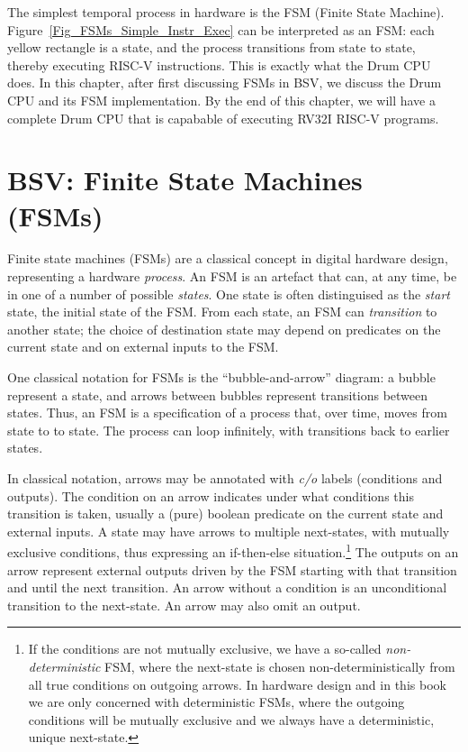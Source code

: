 The simplest temporal process in hardware is the FSM (Finite State
Machine).  Figure~\ref{Fig_FSMs_Simple_Instr_Exec} can be interpreted as an
FSM: each yellow rectangle is a state, and the process transitions
from state to state, thereby executing RISC-V instructions.  This is
exactly what the Drum CPU does.  In this chapter, after first
discussing FSMs in BSV, we discuss the Drum CPU and its FSM
implementation.  By the end of this chapter, we will have a complete
Drum CPU that is capabable of executing RV32I RISC-V programs.


\section{BSV: Finite State Machines (FSMs)}

\label{Sec_FSMs_FSMs}


Finite state machines (FSMs) are a classical concept in digital
hardware design, representing a hardware \emph{process}.  An FSM is an
artefact that can, at any time, be in one of a number of possible
\emph{states}.  One state is often distinguised as the \emph{start}
state, the initial state of the FSM.  From each state, an FSM can
\emph{transition} to another state; the choice of destination state
may depend on predicates on the current state and on external inputs
to the FSM.

One classical notation for FSMs is the ``bubble-and-arrow'' diagram: a
bubble represent a state, and arrows between bubbles represent
transitions between states.  Thus, an FSM is a specification of a
process that, over time, moves from state to to state.  The process
can loop infinitely, with transitions back to earlier states.

In classical notation, arrows may be annotated with \emph{c/o} labels
(conditions and outputs).  The condition on an arrow indicates under
what conditions this transition is taken, usually a (pure) boolean
predicate on the current state and external inputs.  A state may have
arrows to multiple next-states, with mutually exclusive conditions,
thus expressing an if-then-else situation.\footnote{If the conditions
are not mutually exclusive, we have a so-called
\emph{non-deterministic} FSM, where the next-state is chosen
non-deterministically from all true conditions on outgoing arrows.  In
hardware design and in this book we are only concerned with
deterministic FSMs, where the outgoing conditions will be mutually
exclusive and we always have a deterministic, unique next-state.}  The
outputs on an arrow represent external outputs driven by the FSM
starting with that transition and until the next transition.  An arrow
without a condition is an unconditional transition to the next-state.
An arrow may also omit an output.

